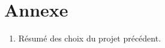 \documentclass{article}
\begin{document}
%
%


\newpage
\section{Annexe}
\begin{enumerate}
  \item Résumé des choix du projet précédent.
\end{enumerate}

\newpage
\begingroup
  \renewcommand{\section}[2]{\Large\textbf{Références}\normalsize}
  
  
  \nocite{*}
\endgroup
\end{document}
